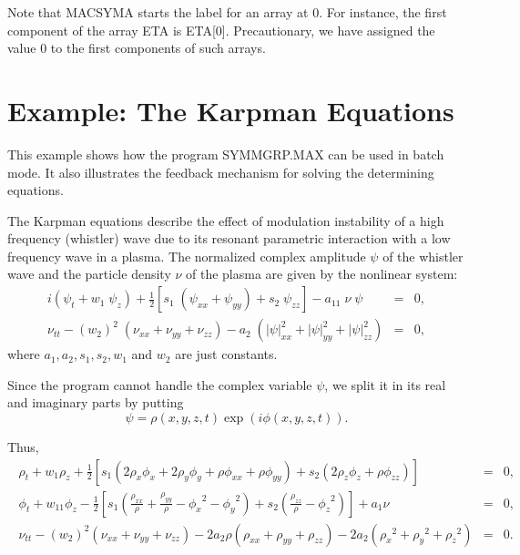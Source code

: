 {\nopagebreak
Note that MACSYMA starts
the label for an array at $0$. For instance, the first component of the array 
ETA is ETA[0]. Precautionary, we have assigned the 
value $0$ to the first components of such arrays. 

\pagebreak
\section{Example: The Karpman Equations}

\nopagebreak
This example shows how the program SYMMGRP.MAX can be used in batch mode. 
It also illustrates the feedback mechanism for solving 
the determining equations.

\nopagebreak
The Karpman equations \cite{karpman1} describe the effect of modulation 
instability of a high frequency (whistler) wave due to 
its resonant parametric interaction with a low frequency wave in a plasma.
The normalized complex amplitude $\psi$ of the whistler wave and the particle
density $\nu$ of the plasma are given by the nonlinear system:
\begin{eqnarray}
i ( {\psi}_t + w_1 \; {\psi}_z ) + \frac{1}{2}  
[ s_1 \; ( \psi_{xx} + \psi_{yy} ) + s_2\; \psi_{zz}] - a_11 \; \nu \; \psi 
& = & 0, \nonumber \\
\nu_{tt} - {(w_{2})}^2 \; ( \nu_{xx} + \nu_{yy} + \nu_{zz} ) 
- a_2 \; ( {\left| \psi \right|}^{2}_{xx} 
+ {\left| \psi \right|}^{2}_{yy} + {\left| \psi \right| }^{2}_{zz} ) &= & 0, 
\label{karpmaneqs}
\end{eqnarray}
where $ a_{1}, a_{2} , s_{1} , s_{2} , w_{1} $ and $w_{2}$ are just constants.

\nopagebreak
Since the program cannot handle the complex variable $\psi$, 
we split it in its real and imaginary parts by putting
\begin{equation}
\psi = \rho (x,y,z,t) \exp ( i \phi ( x,y,z,t) ) .
\label{realandimag}
\end{equation}

\nopagebreak
Thus, 
\begin{eqnarray}
\phantom{2} \!\!\!\!\!\!\!\!\!\! {\rho}_t \!+\! w_1 {\rho}_z 
\!+\! \frac{1}{2} \left[ s_1 ( 2 \rho_{x} \phi_{x} \! +\! 2 \rho_{y} \phi_{y} 
\! + \! \rho \phi_{xx} \! +\! \rho \phi_{yy} )
\! + \! s_2 ( 2 \rho_{z} \phi_{z} \! + \! \rho \phi_{zz} ) \right]\!\!\!\!\!
&=& \!\!\!\!\! 0,\phantom{22}
\nonumber \\
\phantom{2} \!\!\!\!\!\!\!\!\!\! {\phi}_t 
\! + \! w_11 {\phi}_z \! -\! \frac{1}{2}  
\left[ s_1 ( \frac{ \rho_{xx} }{ \rho } \! +\! \frac{ \rho_{yy} }{ \rho } 
\! - \! {\phi_{x}}^2 \! -\! {\phi_{y}}^2 )  
\! +\! s_2 ( \frac{ \rho_{zz} }{ \rho } \! -\! {\phi_{z}}^2 ) \right] 
\! +\! a_1 \nu \!\!\!\!\! &=& \!\!\!\!\! 0, \label{nkarpmaneqs} \\
\phantom{2} \!\!\!\!\!\!\!\!\!\! \nu_{tt} \! -\! {(w_{2})}^2 ( \nu_{xx} 
\! +\! \nu_{yy} \! +\! \nu_{zz} ) 
\! -\! 2 a_2 \rho ( \rho_{xx} \! +\! \rho_{yy} \! +\! \rho_{zz} )
\! -\! 2 a_2 ( {\rho_{x}}^2 \! +\!  {\rho_{y}}^2 
\! +\! {\rho_{z}}^2 ) \!\!\!\!\! &=& \!\!\!\!\! 0.\phantom{22}
\nonumber
\end{eqnarray}

}

